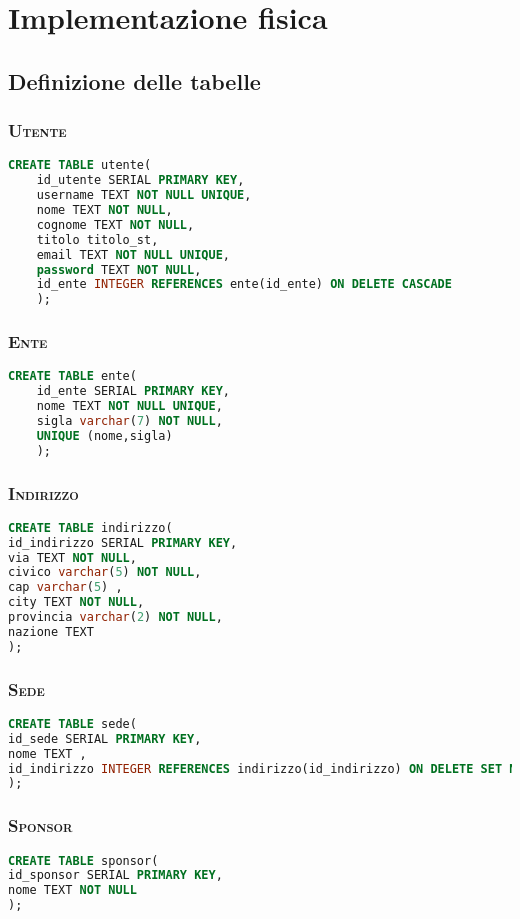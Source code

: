 \chapter{Implementazione fisica}

\section{Definizione delle tabelle}
\subsection{\textsc{Utente}}
\begin{lstlisting}[language=SQL,style=mystyle,caption={Tabella: Utente}]
	CREATE TABLE utente(
	id_utente SERIAL PRIMARY KEY,
	username TEXT NOT NULL UNIQUE,
	nome TEXT NOT NULL,
	cognome TEXT NOT NULL,
	titolo titolo_st,
	email TEXT NOT NULL UNIQUE,
	password TEXT NOT NULL,
	id_ente INTEGER REFERENCES ente(id_ente) ON DELETE CASCADE
	);
\end{lstlisting}
\subsection{\textsc{Ente}}
\begin{lstlisting}[language=SQL,style=mystyle,caption={Tabella: Ente}]
	CREATE TABLE ente(
	id_ente SERIAL PRIMARY KEY,
	nome TEXT NOT NULL UNIQUE,
	sigla varchar(7) NOT NULL,
	UNIQUE (nome,sigla)
	);
\end{lstlisting}
\subsection{\textsc{Indirizzo}}
\begin{lstlisting}[language=SQL,style=mystyle,caption={Tabella: Indirizzo}]
CREATE TABLE indirizzo(
id_indirizzo SERIAL PRIMARY KEY,
via TEXT NOT NULL,
civico varchar(5) NOT NULL,
cap varchar(5) ,
city TEXT NOT NULL,
provincia varchar(2) NOT NULL,
nazione TEXT
);
\end{lstlisting}
\subsection{\textsc{Sede}}
\begin{lstlisting}[language=SQL,style=mystyle,caption={Tabella:  Sede}]
CREATE TABLE sede(
id_sede SERIAL PRIMARY KEY,
nome TEXT ,
id_indirizzo INTEGER REFERENCES indirizzo(id_indirizzo) ON DELETE SET NULL
);
\end{lstlisting}
\subsection{\textsc{Sponsor}}
\begin{lstlisting}[language=SQL,style=mystyle,caption={Tabella: Sponsor}]
CREATE TABLE sponsor(
id_sponsor SERIAL PRIMARY KEY,
nome TEXT NOT NULL
);
\end{lstlisting}
